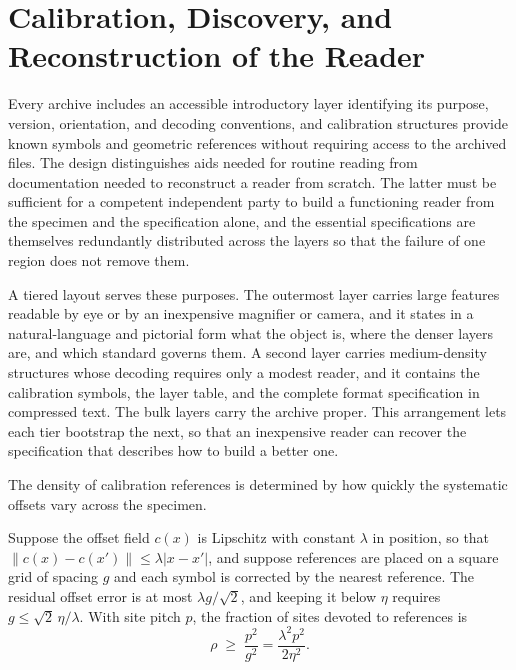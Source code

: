 \section{Calibration, Discovery, and Reconstruction of the Reader}\label{sec:calibration}

Every archive includes an accessible introductory layer identifying its purpose, version, orientation, and decoding conventions, and calibration structures provide known symbols and geometric references without requiring access to the archived files. The design distinguishes aids needed for routine reading from documentation needed to reconstruct a reader from scratch. The latter must be sufficient for a competent independent party to build a functioning reader from the specimen and the specification alone, and the essential specifications are themselves redundantly distributed across the layers so that the failure of one region does not remove them.

A tiered layout serves these purposes. The outermost layer carries large features readable by eye or by an inexpensive magnifier or camera, and it states in a natural-language and pictorial form what the object is, where the denser layers are, and which standard governs them. A second layer carries medium-density structures whose decoding requires only a modest reader, and it contains the calibration symbols, the layer table, and the complete format specification in compressed text. The bulk layers carry the archive proper. This arrangement lets each tier bootstrap the next, so that an inexpensive reader can recover the specification that describes how to build a better one.

The density of calibration references is determined by how quickly the systematic offsets vary across the specimen.

\begin{proposition}\label{prop:refs}
Suppose the offset field $c(x)$ is Lipschitz with constant $\lambda$ in position, so that $\|c(x)-c(x')\|\le\lambda|x-x'|$, and suppose references are placed on a square grid of spacing $g$ and each symbol is corrected by the nearest reference. The residual offset error is at most $\lambda g/\sqrt2$, and keeping it below $\eta$ requires $g\le\sqrt2\,\eta/\lambda$. With site pitch $p$, the fraction of sites devoted to references is
\[
\rho\;\ge\;\frac{p^{2}}{g^{2}}=\frac{\lambda^{2}p^{2}}{2\eta^{2}} .
\]
\end{proposition}

